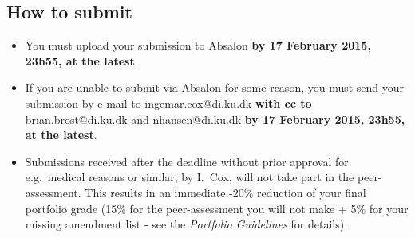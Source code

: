 \documentclass[10pt]{article}
\begin{document}
\subsection{How to submit}
\begin{itemize}
\item You must upload your submission to Absalon \textbf{by 17 February 2015, 23h55, at the latest}.
\item If you are unable to submit via Absalon for some reason, you must send your submission by e-mail to ingemar.cox@di.ku.dk \underline{\textbf{with cc to}} \\ brian.brost@di.ku.dk and nhansen@di.ku.dk \textbf{by 17 February 2015, 23h55, at the latest}.
\item Submissions received after the deadline without prior approval for e.g.\ medical reasons or similar, by I.\ Cox, will not take part in the peer-assessment. This results in an immediate -20\% reduction of your final portfolio grade (15\% for the peer-assessment you will not make + 5\% for your missing amendment list - see the \textit{Portfolio Guidelines} for details).

\end{itemize}



 
\end{document}
